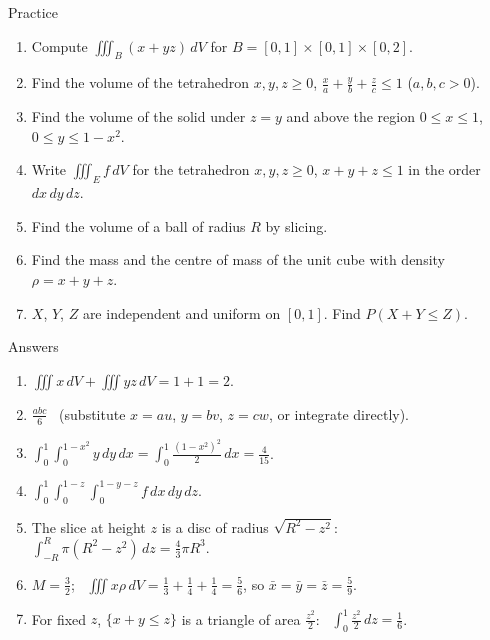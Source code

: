 \documentclass[10pt]{wosm-slides}
\newcommand{\dV}{\, dV}
\begin{document}
\begin{frame}{Practice}
  \small
  \begin{enumerate}
    \item Compute $\iiint_B (x + yz) \dV$ for $B = [0, 1] \times [0, 1] \times [0, 2]$.
    \item Find the volume of the tetrahedron $x, y, z \ge 0$, $\frac xa + \frac yb + \frac zc \le 1$ ($a, b, c > 0$).
    \item Find the volume of the solid under $z = y$ and above the region $0 \le x \le 1$, $0 \le y \le 1 - x^2$.
    \item Write $\iiint_E f \dV$ for the tetrahedron $x, y, z \ge 0$, $x + y + z \le 1$ in the order
      $dx\, dy\, dz$.
    \item Find the volume of a ball of radius $R$ by slicing.
    \item Find the mass and the centre of mass of the unit cube with density $\rho = x + y + z$.
    \item $X$, $Y$, $Z$ are independent and uniform on $[0, 1]$. Find $P(X + Y \le Z)$.
  \end{enumerate}
\end{frame}

\begin{frame}{Answers}
  \small
  \begin{enumerate}
    \item $\iiint x \dV + \iiint yz \dV = 1 + 1 = 2$.
    \item $\frac{abc}{6}$ \ (substitute $x = au$, $y = bv$, $z = cw$, or integrate directly).
    \item $\int_0^1 \int_0^{1-x^2} y\, dy\, dx = \int_0^1 \frac{(1 - x^2)^2}{2}\, dx = \frac{4}{15}$.
    \item $\int_0^1 \int_0^{1-z} \int_0^{1-y-z} f\, dx\, dy\, dz$.
    \item The slice at height $z$ is a disc of radius $\sqrt{R^2 - z^2}$:
      $\int_{-R}^R \pi(R^2 - z^2)\, dz = \frac43 \pi R^3$.
    \item $M = \frac32$; \ $\iiint x\rho \dV = \frac13 + \frac14 + \frac14 = \frac56$, so
      $\bar x = \bar y = \bar z = \frac59$.
    \item For fixed $z$, $\{x + y \le z\}$ is a triangle of area $\frac{z^2}{2}$: \
      $\int_0^1 \frac{z^2}{2}\, dz = \frac16$.
  \end{enumerate}
\end{frame}
\end{document}
